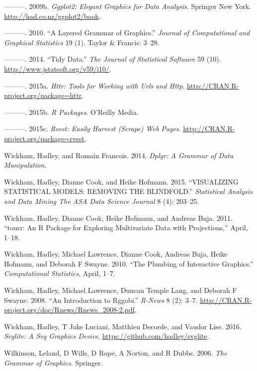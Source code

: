 \documentclass[12pt,]{isuthesis}
\begin{document}
\hypertarget{ref-ggplot2-book}{}
---------. 2009b. \emph{Ggplot2: Elegant Graphics for Data Analysis}.
Springer New York. \url{http://had.co.nz/ggplot2/book}.

\hypertarget{ref-ggplot2-paper}{}
---------. 2010. ``A Layered Grammar of Graphics.'' \emph{Journal of
Computational and Graphical Statistics} 19 (1). Taylor \& Francis:
3--28.

\hypertarget{ref-tidy-data}{}
---------. 2014. ``Tidy Data.'' \emph{The Journal of Statistical
Software} 59 (10). \url{http://www.jstatsoft.org/v59/i10/}.

\hypertarget{ref-httr}{}
---------. 2015a. \emph{Httr: Tools for Working with Urls and Http}.
\url{http://CRAN.R-project.org/package=httr}.

\hypertarget{ref-rpkgs}{}
---------. 2015b. \emph{R Packages}. O'Reilly Media.

\hypertarget{ref-rvest}{}
---------. 2015c. \emph{Rvest: Easily Harvest (Scrape) Web Pages}.
\url{http://CRAN.R-project.org/package=rvest}.

\hypertarget{ref-dplyr}{}
Wickham, Hadley, and Romain Francois. 2014. \emph{Dplyr: A Grammar of
Data Manipulation}.

\hypertarget{ref-Wickham:2015ur}{}
Wickham, Hadley, Dianne Cook, and Heike Hofmann. 2015. ``VISUALIZING
STATISTICAL MODELS: REMOVING THE BLINDFOLD.'' \emph{Statistical Analysis
and Data Mining The ASA Data Science Journal} 8 (4): 203--25.

\hypertarget{ref-tourr}{}
Wickham, Hadley, Dianne Cook, Heike Hofmann, and Andreas Buja. 2011.
``tourr: An R Package for Exploring Multivariate Data with
Projections,'' April, 1--18.

\hypertarget{ref-plumbing}{}
Wickham, Hadley, Michael Lawrence, Dianne Cook, Andreas Buja, Heike
Hofmann, and Deborah F Swayne. 2010. ``The Plumbing of Interactive
Graphics.'' \emph{Computational Statistics}, April, 1--7.

\hypertarget{ref-rggobi}{}
Wickham, Hadley, Michael Lawrence, Duncan Temple Lang, and Deborah F
Swayne. 2008. ``An Introduction to Rggobi.'' \emph{R-News} 8 (2): 3--7.
\url{http://CRAN.R-project.org/doc/Rnews/Rnews_2008-2.pdf}.

\hypertarget{ref-svglite}{}
Wickham, Hadley, T Jake Luciani, Matthieu Decorde, and Vaudor Lise.
2016. \emph{Svglite: A Svg Graphics Device}.
\url{https://github.com/hadley/svglite}.

\hypertarget{ref-wilkinson}{}
Wilkinson, Leland, D Wills, D Rope, A Norton, and R Dubbs. 2006.
\emph{The Grammar of Graphics}. Springer.
\end{document}
